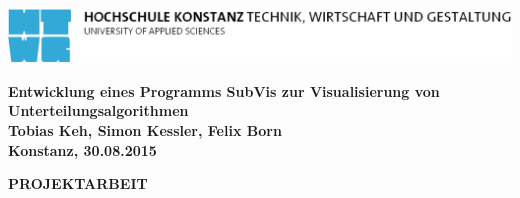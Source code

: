 \begin{titlepage}

\vspace*{-3.5cm}

\begin{flushleft}
\hspace*{-1cm} \includegraphics[width=15.7cm]{content/media/htwg-logo}
\end{flushleft}

\vspace{2.5cm}

\begin{center}
	\huge{
		\textbf{Entwicklung eines Programms SubVis zur Visualisierung von Unterteilungsalgorithmen} \\[5cm]
	}
	\Large{
		\textbf{Tobias Keh, Simon Kessler, Felix Born}} \\[6.5cm]
	\large{
		\textbf{Konstanz, 30.08.2015} \\[2.3cm]
	}
	
	\Huge{
		\textbf{{\sf PROJEKTARBEIT}}
	}
\end{center}

\end{titlepage}